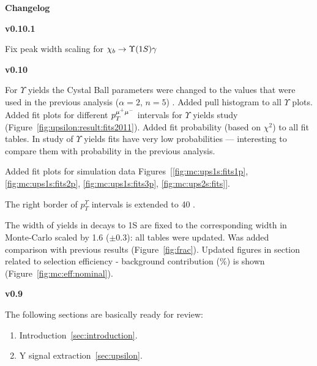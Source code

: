 {\noindent\bf\Large Changelog}

\begingroup
\fontsize{7pt}{12pt}\selectfont

{\bf v0.10.1}

Fix peak width scaling for $\chi_b \to \Y1S \gamma$

{\bf v0.10}

For $\Upsilon$ yields the Cystal Ball parameters were changed to the values that
were used in the previous analysis ($\alpha=2$, $n=5$) . Added pull histogram to
all $\Upsilon$ plots. Added fit plots for different $p_T^{\mu^+\mu^-}$ intervals for
$\Upsilon$ yields study (Figure~\ref{fig:upsilon:result:fits2011}). Added fit
probability (based on $\chi^2$) to all fit tables. In study of $\Upsilon$ yields
fits have very low probabilities --- interesting to compare them with
probability in the previous analysis.

Added fit plots for simulation data
Figures~[\ref{fig:mc:ups1s:fits1p},\ref{fig:mc:ups1s:fits2p}, \ref{fig:mc:ups1s:fits3p},
\ref{fig:mc:ups2s:fits}].

The right border of $p_T^{\Upsilon}$ intervals is extended to 40 \gevc.

The width of \chib yields in decays to \Y1S are fixed to the corresponding width
in Monte-Carlo scaled by 1.6 ($\pm 0.3$): all tables were updated.
Was added comparison with previous results (Figure~\ref{fig:frac}).
Updated figures in section related to selection efficiency - background
contribution (\%) is shown (Figure~\ref{fig:mc:eff:nominal}).




{\bf v0.9}

The following sections are basically ready for review:
\begin{enumerate}
\item Introduction~\ref{sec:introduction}.
\item Y signal extraction~\ref{sec:upsilon}.
\end{enumerate}
\endgroup
